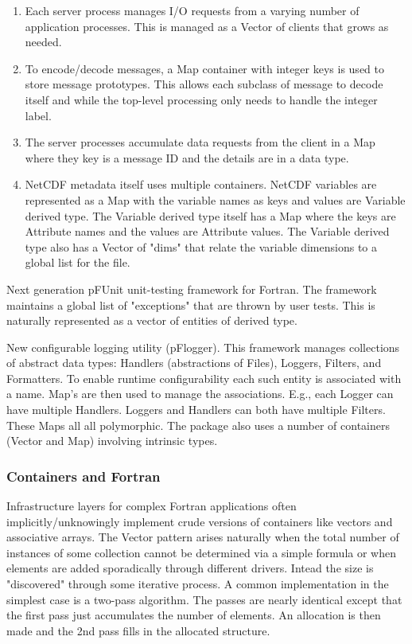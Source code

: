 \documentclass{article}
\begin{document}
\begin{enumerate}
\item Each server process manages I/O requests from a varying      number of application processes.  This is managed as a Vector of      clients that grows as needed.

\item To encode/decode messages, a Map container with integer keys is       used to store message prototypes.  This allows each subclass of       message to decode itself and while the top-level processing       only needs to handle the integer label.

\item The server processes accumulate data requests from the client        in a Map where they key is a message ID and the details are in        a data type.

\item NetCDF metadata itself uses multiple containers.  NetCDF       variables are represented as a Map with the variable names as       keys and values are Variable derived type.  The Variable
       derived type itself has a Map where the keys are Attribute       names and the values are Attribute values.  The Variable       derived type also has a Vector of "dims" that relate the
       variable dimensions to a global list for the file.
\end{enumerate}

 Next generation pFUnit unit-testing framework for Fortran.  The  framework maintains a global list of "exceptions" that are thrown by user tests.  This is naturally represented as a vector of entities of derived type.

 New configurable logging utility (pFlogger).  This framework   manages collections of abstract data types: Handlers (abstractions   of Files), Loggers, Filters, and Formatters.  To enable runtime
   configurability each such entity is associated with a name.  Map's   are then used to manage the associations.  E.g., each Logger can   have multiple Handlers.  Loggers and Handlers can both have
   multiple Filters.  These Maps all all polymorphic.  The package   also uses a number of containers (Vector and Map) involving   intrinsic types.

\subsubsection{Containers and Fortran}

Infrastructure layers for complex Fortran applications often
implicitly/unknowingly implement crude versions of containers like
vectors and associative arrays.  The Vector pattern arises naturally
when the total number of instances of some collection cannot be
determined via a simple formula or when elements are added
sporadically through different drivers.  Intead the size is
"discovered" through some iterative process.  A common implementation
in the simplest case is a two-pass algorithm.  The passes are nearly
identical except that the first pass just accumulates the number of
elements.  An allocation is then made and the 2nd pass fills in the
allocated structure.
\end{document}
